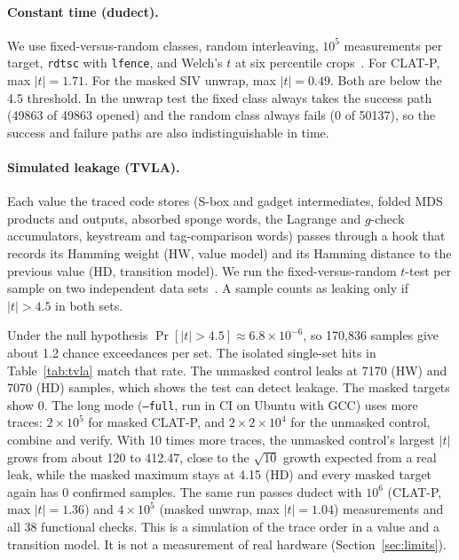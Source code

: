 \documentclass[10pt,a4paper]{article}
\newcommand{\code}[1]{\texttt{#1}}
\newcommand{\abs}[1]{\left\lvert #1 \right\rvert}
\theoremstyle{definition}
\theoremstyle{remark}
\begin{document}
\paragraph{Constant time (dudect).}
We use fixed-versus-random classes, random interleaving, $10^5$ measurements per target, \code{rdtsc} with \code{lfence}, and Welch's $t$ at six percentile crops~\cite{dudect}. For CLAT-P, max $\abs{t} = 1.71$. For the masked SIV unwrap, max $\abs{t} = 0.49$. Both are below the 4.5 threshold. In the unwrap test the fixed class always takes the success path (49863 of 49863 opened) and the random class always fails (0 of 50137), so the success and failure paths are also indistinguishable in time.

\paragraph{Simulated leakage (TVLA).}
Each value the traced code stores (S-box and gadget intermediates, folded MDS products and outputs, absorbed sponge words, the Lagrange and $g$-check accumulators, keystream and tag-comparison words) passes through a hook that records its Hamming weight (HW, value model) and its Hamming distance to the previous value (HD, transition model). We run the fixed-versus-random $t$-test per sample on two independent data sets~\cite{tvla}. A sample counts as leaking only if $\abs{t} > 4.5$ in both sets.

Under the null hypothesis $\Pr[\abs{t} > 4.5] \approx 6.8\times10^{-6}$, so 170{,}836 samples give about 1.2 chance exceedances per set. The isolated single-set hits in Table~\ref{tab:tvla} match that rate. The unmasked control leaks at 7170 (HW) and 7070 (HD) samples, which shows the test can detect leakage. The masked targets show 0. The long mode (\code{--full}, run in CI on Ubuntu with GCC) uses more traces: $2\times10^5$ for masked CLAT-P, and $2\times2\times10^4$ for the unmasked control, combine and verify. With 10 times more traces, the unmasked control's largest $\abs{t}$ grows from about 120 to 412.47, close to the $\sqrt{10}$ growth expected from a real leak, while the masked maximum stays at 4.15 (HD) and every masked target again has 0 confirmed samples. The same run passes dudect with $10^6$ (CLAT-P, max $\abs{t} = 1.36$) and $4\times10^5$ (masked unwrap, max $\abs{t} = 1.04$) measurements and all 38 functional checks. This is a simulation of the trace order in a value and a transition model. It is not a measurement of real hardware (Section~\ref{sec:limits}).
\end{document}
